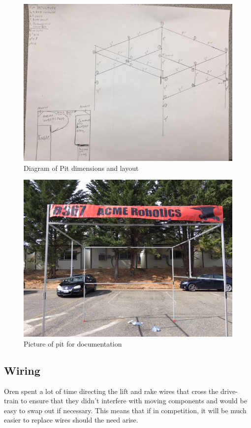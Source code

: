 \documentclass{article}
\begin{document}
\begin{figure}
    \centering
    \includegraphics[width= 0.5 \textwidth]{30_03-25/images/pitdiagram2.JPG}
    \caption{Diagram of Pit dimensions and layout}
    \label{fig:finishedpit}
\end{figure}

\begin{figure}
    \centering
    \includegraphics[width= 0.5 \textwidth]{30_03-25/images/pitpicture.JPG}
    \caption{Picture of pit for documentation}
    \label{fig:diagram}
\end{figure}

\subsection{Wiring}
Oren spent a lot of time directing the lift and rake wires that cross the drive-train to ensure that they didn't interfere with moving components and would be easy to swap out if necessary. This means that if in competition, it will be much easier to replace wires should the need arise. 
\end{document}
